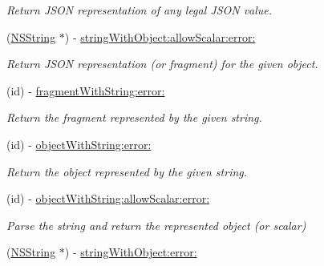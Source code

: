 \begin{DoxyCompactItemize}
\begin{DoxyCompactList}\small\item\em \-Return \-J\-S\-O\-N representation of any legal \-J\-S\-O\-N value. \end{DoxyCompactList}\item 
\hypertarget{interface_s_b_j_s_o_n_a1daa6e2cb4bac21afe6c884ece6dc4ad}{
(\hyperlink{class_n_s_string}{\-N\-S\-String} $\ast$) -\/ \hyperlink{interface_s_b_j_s_o_n_a1daa6e2cb4bac21afe6c884ece6dc4ad}{string\-With\-Object\-:allow\-Scalar\-:error\-:}}
\label{interface_s_b_j_s_o_n_a1daa6e2cb4bac21afe6c884ece6dc4ad}

\begin{DoxyCompactList}\small\item\em \-Return \-J\-S\-O\-N representation (or fragment) for the given object. \end{DoxyCompactList}\item 
\hypertarget{interface_s_b_j_s_o_n_aa88f7cb9ddc4ab7fd6e9fc0853e6da6a}{
(id) -\/ \hyperlink{interface_s_b_j_s_o_n_aa88f7cb9ddc4ab7fd6e9fc0853e6da6a}{fragment\-With\-String\-:error\-:}}
\label{interface_s_b_j_s_o_n_aa88f7cb9ddc4ab7fd6e9fc0853e6da6a}

\begin{DoxyCompactList}\small\item\em \-Return the fragment represented by the given string. \end{DoxyCompactList}\item 
\hypertarget{interface_s_b_j_s_o_n_a2b0ae389a765270663c1e1110bcef613}{
(id) -\/ \hyperlink{interface_s_b_j_s_o_n_a2b0ae389a765270663c1e1110bcef613}{object\-With\-String\-:error\-:}}
\label{interface_s_b_j_s_o_n_a2b0ae389a765270663c1e1110bcef613}

\begin{DoxyCompactList}\small\item\em \-Return the object represented by the given string. \end{DoxyCompactList}\item 
\hypertarget{interface_s_b_j_s_o_n_a942831fa293980ad189b72860055d32a}{
(id) -\/ \hyperlink{interface_s_b_j_s_o_n_a942831fa293980ad189b72860055d32a}{object\-With\-String\-:allow\-Scalar\-:error\-:}}
\label{interface_s_b_j_s_o_n_a942831fa293980ad189b72860055d32a}

\begin{DoxyCompactList}\small\item\em \-Parse the string and return the represented object (or scalar) \end{DoxyCompactList}\item 
\hypertarget{interface_s_b_j_s_o_n_a3687db463abee044cb06e0924142deb8}{
(\hyperlink{class_n_s_string}{\-N\-S\-String} $\ast$) -\/ \hyperlink{interface_s_b_j_s_o_n_a3687db463abee044cb06e0924142deb8}{string\-With\-Object\-:error\-:}}
\label{interface_s_b_j_s_o_n_a3687db463abee044cb06e0924142deb8}


\end{DoxyCompactItemize}
